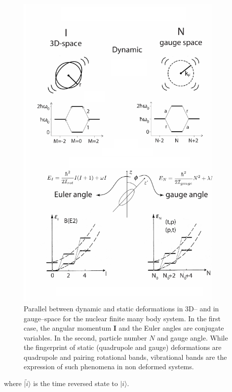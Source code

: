 \begin{figure}
\centerline{\includegraphics*[width=0.9\textwidth,angle=0]{nutshell/figs/fig1D1_v2.pdf}}
\caption{Parallel between dynamic and static deformations in 3D-- and in gauge--space for the nuclear finite many body system. In the first case, the angular momentum $\mathbf{I}$ and the Euler angles are conjugate variables. In the second, particle number $N$ and gauge angle. While the fingerprint of static (quadrupole and gauge) deformations are quadrupole and pairing rotational bands, vibrational bands are the expression of such phenomena in non deformed systems.}\label{fig1D1}
\end{figure}
where $|\tilde i\rangle$  is the time reversed state to  $| i\rangle$.


